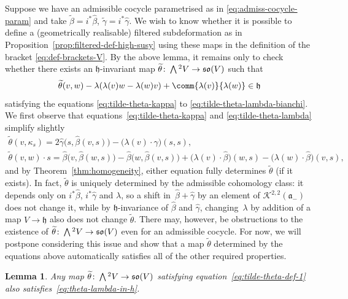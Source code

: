 \documentclass[10pt,a4paper]{amsart}
\numberwithin{equation}{section}
\newtheorem{Lemma}[Theorem]{Lemma}
\newcommand{\fa}{\mathfrak{a}}
\newcommand{\fh}{\mathfrak{h}}
\newcommand{\fso}{\mathfrak{so}}
\newcommand{\cK}{\mathcal{K}}
\newcommand{\betahat}{\widehat{\beta}}
\newcommand{\gammahat}{\widehat{\gamma}}
\newcommand{\betatilde}{\widetilde{\beta}}
\newcommand{\gammatilde}{\widetilde{\gamma}}
\newcommand{\thetatilde}{\widetilde{\theta}}
\newcommand{\Wedge}{\mathchoice{{\textstyle\bigwedge}}{\bigwedge}{\bigwedge}{\bigwedge}}	%
\newcommand{\1}{\mathbbm{1}}
\begin{document}
Suppose we have an admissible cocycle parametrised as in \eqref{eq:admiss-cocycle-param} and take $\betatilde=i^*\betahat$, $\gammatilde=i^*\gammahat$. We wish to know whether it is possible to define a (geometrically realisable) filtered subdeformation as in Proposition~\ref{prop:filtered-def-high-susy} using these maps in the definition of the bracket \eqref{eq:def-brackets-V}. By the above lemma, it remains only to check whether there exists an $\fh$-invariant map $\thetatilde\colon \Wedge^2V\to \fso(V)$ such that
\begin{equation}\label{eq:theta-lambda-in-h}
	\thetatilde(v,w) - \lambda(\lambda(v)w-\lambda(w)v) + \comm{\lambda(v)}{\lambda(w)} \in \fh
\end{equation}
satisfying the equations \eqref{eq:tilde-theta-kappa} to \eqref{eq:tilde-theta-lambda-bianchi}. We first observe that equations~\eqref{eq:tilde-theta-kappa} and \eqref{eq:tilde-theta-lambda} simplify slightly
\begin{gather}
	\thetatilde(v,\kappa_s) = 2\gammahat\bigl(s,\betahat(v,s)\bigr) - \bigl(\lambda(v)\cdot\gammahat\bigr)(s,s),
	\label{eq:tilde-theta-def-1}\\
		\thetatilde(v,w)\cdot s
		= \betahat\bigl(v,\betahat(w,s)\bigr) - \betahat\bigl(w,\betahat(v,s)\bigr) + \bigl(\lambda(v)\cdot\betahat\bigr)(w,s) - \bigl(\lambda(w)\cdot\betahat\bigr)(v,s),
		\label{eq:tilde-theta-act-s}
\end{gather}
and by Theorem~\ref{thm:homogeneity}, either equation fully determines $\thetatilde$ (if it exists). In fact, $\thetatilde$ is uniquely determined by the admissible cohomology class: it depends only on $i^*\betahat$, $i^*\gammahat$ and $\lambda$, so a shift in~${\betahat+\gammahat}$ by an element of $\cK^{2,2}(\fa_-)$ does not change it, while by $\fh$-invariance of $\betahat$ and $\gammahat$, changing~$\lambda$ by addition of a map $V\to\fh$ also does not change $\thetatilde$. There may, however, be obstructions to the existence of $\thetatilde\colon\Wedge^2 V\to \fso(V)$ even for an admissible cocycle. For now, we will postpone considering this issue and show that a map $\thetatilde$ determined by the equations above automatically satisfies all of the other required properties.

\begin{Lemma}\label{lemma:theta-lambda-in-h}
	Any map $\thetatilde\colon\Wedge^2V\to \fso(V)$ satisfying equation~\eqref{eq:tilde-theta-def-1} also satisfies~\eqref{eq:theta-lambda-in-h}.
\end{Lemma}
\end{document}
